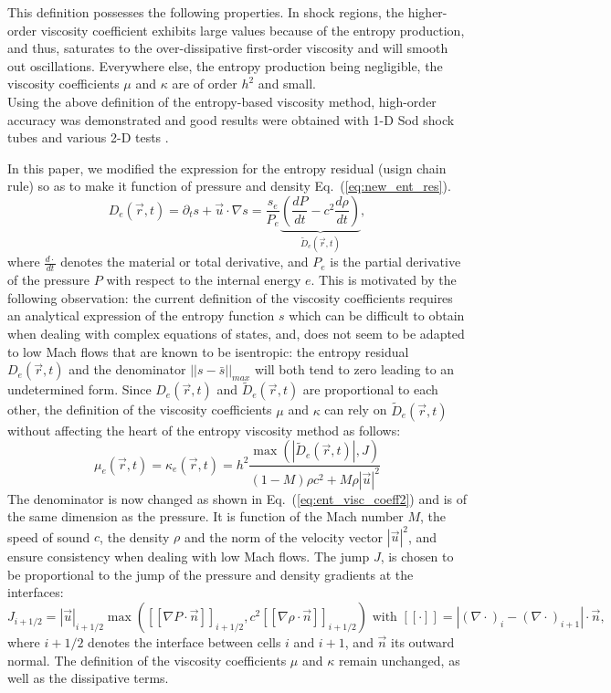 \documentclass[12pt]{article}
\newcommand{\eqt}[1]{Eq.~(\ref{#1})} %
\begin{document}
This definition possesses the following properties.
In shock regions, the higher-order viscosity coefficient exhibits large values because of the entropy production, and thus, saturates to the over-dissipative first-order viscosity and will smooth out oscillations. Everywhere else, the entropy production being negligible, the viscosity coefficients $\mu$ and $\kappa$ are of order $h^2$ and small.\\
Using the above definition of the entropy-based viscosity method, high-order accuracy was demonstrated and good results were obtained with 1-D Sod shock tubes and various 2-D tests \cite{valentin, jlg1, jlg2}.

In this paper, we modified the expression for the entropy residual (usign chain rule) so as to make it function of pressure and  density \eqt{eq:new_ent_res}. 
\begin{equation}
\label{eq:new_ent_res}
D_e(\vec{r},t) = \partial_t s + \vec{u} \cdot \nabla s = \frac{s_e}{P_e} \underbrace{\left( \frac{d P}{dt} - c^2 \frac{d \rho}{dt} \right)}_{\tilde{D}_e(\vec{r},t)},
\end{equation}
where $\frac{d \cdot}{dt}$ denotes the material or total derivative, and $P_e$ is the partial derivative of the pressure $P$ with respect to the internal energy $e$. 
This is motivated by the following observation: the current definition of the viscosity coefficients requires an analytical expression of the entropy function $s$ which can be difficult to obtain when dealing with complex equations of states, and, does not seem to be adapted to low Mach flows that are known to be isentropic: the entropy residual $D_e(\vec{r},t)$ and the denominator $|| s - \bar{s} ||_{max}$ will both tend to zero leading to an undetermined form. Since $D_e(\vec{r},t)$ and $\tilde{D}_e(\vec{r},t)$ are proportional to each other, the definition of the viscosity coefficients $\mu$ and $\kappa$ can rely on $\tilde{D}_e(\vec{r},t)$ without affecting the heart of the entropy viscosity method as follows: 
\begin{equation}
\label{eq:ent_visc_coeff2}
\mu_e(\vec{r},t) = \kappa_e(\vec{r},t) = h^2 \frac{\max\left( | \tilde{D}_e(\vec{r},t) |, J \right)}{(1-M) \rho c^2 + M \rho |\vec{u}|^2}
\end{equation}
The denominator is now changed as shown in \eqt{eq:ent_visc_coeff2} and is of the same dimension as the pressure. It is function of the Mach number $M$, the speed of sound $c$, the density $\rho$ and the norm of the velocity vector $|\vec{u}|^2$, and ensure consistency when dealing with low Mach flows. The jump $J$,  is chosen to be proportional to the jump of the pressure and density gradients at the interfaces:
\begin{equation}
\label{eq:equation23}
J_{i+1/2} = |\vec{u}|_{i+1/2} \max \left( [[ \nabla P \cdot \vec{n} ]]_{i+1/2}, c^2 [[ \nabla \rho \cdot \vec{n} ]]_{i+1/2} \right) \text{ with } [[ \cdot ]] = |(\nabla \cdot)_i -  (\nabla \cdot)_{i+1}| \cdot \vec{n},
\end{equation}
where $i+1/2$ denotes the interface between cells $i$ and $i+1$, and $\vec{n}$ its outward normal.
The definition of the viscosity coefficients $\mu$ and $\kappa$ remain unchanged, as well as the dissipative terms.
\end{document}
